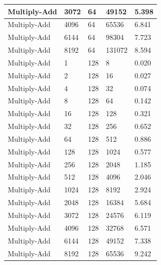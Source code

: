 \documentclass{article}
\begin{document}
\begin{longtable}{|l|l|l|l|l|}
Multiply-Add       & 3072 & 64          & 49152             & 5.398             \\ \hline
Multiply-Add       & 4096 & 64          & 65536             & 6.841             \\ \hline
Multiply-Add       & 6144 & 64          & 98304             & 7.723             \\ \hline
Multiply-Add       & 8192 & 64          & 131072            & 8.594             \\ \hline
Multiply-Add       & 1    & 128         & 8                 & 0.020             \\ \hline
Multiply-Add       & 2    & 128         & 16                & 0.027             \\ \hline
Multiply-Add       & 4    & 128         & 32                & 0.074             \\ \hline
Multiply-Add       & 8    & 128         & 64                & 0.142             \\ \hline
Multiply-Add       & 16   & 128         & 128               & 0.321             \\ \hline
Multiply-Add       & 32   & 128         & 256               & 0.652             \\ \hline
Multiply-Add       & 64   & 128         & 512               & 0.886             \\ \hline
Multiply-Add       & 128  & 128         & 1024              & 0.577             \\ \hline
Multiply-Add       & 256  & 128         & 2048              & 1.185             \\ \hline
Multiply-Add       & 512  & 128         & 4096              & 2.046             \\ \hline
Multiply-Add       & 1024 & 128         & 8192              & 2.924             \\ \hline
Multiply-Add       & 2048 & 128         & 16384             & 5.684             \\ \hline
Multiply-Add       & 3072 & 128         & 24576             & 6.119             \\ \hline
Multiply-Add       & 4096 & 128         & 32768             & 6.571             \\ \hline
Multiply-Add       & 6144 & 128         & 49152             & 7.338             \\ \hline
Multiply-Add       & 8192 & 128         & 65536             & 9.242             \\ \hline

\end{longtable}
\end{document}
